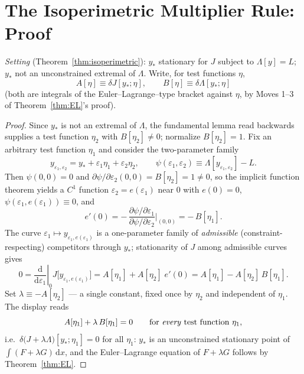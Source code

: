 \documentclass[11pt]{article}
\theoremstyle{plain}
\theoremstyle{definition}
\theoremstyle{remark}
\newcommand{\dd}{\mathrm{d}}
\begin{document}
\section{The Isoperimetric Multiplier Rule: Proof}
\label{app:isoperimetric}

\emph{Setting} (Theorem~\ref{thm:isoperimetric}): $y_\ast$ stationary for
$J$ subject to $\Lambda[y] = L$; $y_\ast$ not an unconstrained extremal of
$\Lambda$. Write, for test functions $\eta$,
\begin{equation}
  A[\eta] \equiv \delta J[y_\ast;\eta],
  \qquad
  B[\eta] \equiv \delta\Lambda[y_\ast;\eta]
\end{equation}
(both are integrals of the Euler--Lagrange--type bracket against $\eta$,
by Moves 1--3 of Theorem~\ref{thm:EL}'s proof).

\begin{proof}
Since $y_\ast$ is not an extremal of $\Lambda$, the fundamental lemma read
backwards supplies a test function $\eta_2$ with
$B[\eta_2] \neq 0$; normalize $B[\eta_2] = 1$. Fix an arbitrary test
function $\eta_1$ and consider the two-parameter family
\begin{equation}
  y_{\varepsilon_1,\varepsilon_2}
  = y_\ast + \varepsilon_1\eta_1 + \varepsilon_2\eta_2,
  \qquad
  \psi(\varepsilon_1,\varepsilon_2)
  \equiv \Lambda[y_{\varepsilon_1,\varepsilon_2}] - L .
\end{equation}
Then $\psi(0,0) = 0$ and
$\partial\psi/\partial\varepsilon_2(0,0) = B[\eta_2] = 1 \neq 0$, so the
implicit function theorem yields a $C^1$ function
$\varepsilon_2 = e(\varepsilon_1)$ near $0$ with $e(0) = 0$,
$\psi(\varepsilon_1, e(\varepsilon_1)) \equiv 0$, and
\begin{equation}
  e'(0)
  = -\,\frac{\partial\psi/\partial\varepsilon_1}
           {\partial\psi/\partial\varepsilon_2}\bigg|_{(0,0)}
  = -\,B[\eta_1] .
\end{equation}
The curve $\varepsilon_1 \mapsto y_{\varepsilon_1, e(\varepsilon_1)}$ is a
one-parameter family of \emph{admissible} (constraint-respecting)
competitors through $y_\ast$; stationarity of $J$ among admissible curves
gives
\begin{equation}
  0 = \left.\frac{\dd}{\dd\varepsilon_1}\right|_0
  J\bigl[y_{\varepsilon_1, e(\varepsilon_1)}\bigr]
  = A[\eta_1] + A[\eta_2]\;e'(0)
  = A[\eta_1] - A[\eta_2]\,B[\eta_1] .
\end{equation}
Set $\lambda \equiv -A[\eta_2]$ --- a single constant, fixed once by
$\eta_2$ and independent of $\eta_1$. The display reads
\begin{equation}
  A[\eta_1] + \lambda\,B[\eta_1] = 0
  \qquad\text{for \emph{every} test function } \eta_1 ,
\end{equation}
i.e.\ $\delta\bigl(J + \lambda\Lambda\bigr)[y_\ast;\eta_1] = 0$ for all
$\eta_1$: $y_\ast$ is an unconstrained stationary point of
$\int (F + \lambda G)\,\dd x$, and the Euler--Lagrange equation of
$F + \lambda G$ follows by Theorem~\ref{thm:EL}.
\end{proof}
\end{document}
